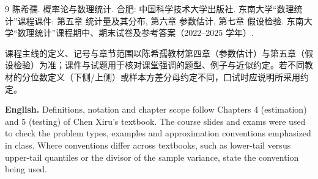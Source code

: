 \documentclass[UTF8,11pt,a4paper]{ctexart}
\newcommand{\EN}[1]{\par\noindent\textbf{English.} #1\par}
\begin{document}
\begingroup
\renewcommand{\refname}{参考文献 | References}
\begin{thebibliography}{9}
 陈希孺. 概率论与数理统计. 合肥: 中国科学技术大学出版社.
 东南大学“数理统计”课程课件: 第五章 统计量及其分布, 第六章 参数估计, 第七章 假设检验.
 东南大学“数理统计”课程期中、期末试卷及参考答案（2022--2025 学年）.
\end{thebibliography}
\endgroup
\noindent 课程主线的定义、记号与章节范围以陈希孺教材第四章（参数估计）与第五章（假设检验）为准；课件与试题用于核对课堂强调的题型、例子与近似约定。若不同教材的分位数定义（下侧/上侧）或样本方差分母约定不同，口试时应说明所采用约定。
\EN{Definitions, notation and chapter scope follow Chapters 4 (estimation) and 5 (testing) of Chen Xiru's textbook. The course slides and exams were used to check the problem types, examples and approximation conventions emphasized in class. Where conventions differ across textbooks, such as lower-tail versus upper-tail quantiles or the divisor of the sample variance, state the convention being used.}
\end{document}
